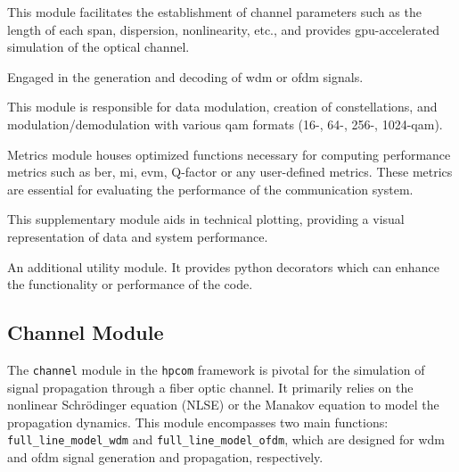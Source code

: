 \begin{description}[style=multiline, leftmargin=2.5cm, font=\normalfont]
    \item[\texttt{channel}] This module facilitates the establishment of channel parameters such as the length of each span, dispersion, nonlinearity, etc., and provides \acrshort{gpu}-accelerated simulation of the optical channel.
    \item[\texttt{signal}] Engaged in the generation and decoding of \acrlong{wdm} or \acrlong{ofdm} signals.
    \item[\texttt{modulation}] This module is responsible for data modulation, creation of constellations, and modulation/demodulation with various \acrlong{qam} formats (16-, 64-, 256-, 1024-\acrshort{qam}).
    \item[\texttt{metrics}] Metrics module houses optimized functions necessary for computing performance metrics such as \acrshort{ber}, \acrshort{mi}, \acrshort{evm}, Q-factor or any user-defined metrics. These metrics are essential for evaluating the performance of the communication system.
    \item[\texttt{plot}] This supplementary module aids in technical plotting, providing a visual representation of data and system performance.
    \item[\texttt{decorators}] An additional utility module. It provides python decorators which can enhance the functionality or performance of the code.
\end{description}

\subsection{Channel Module}
The \texttt{channel} module in the \texttt{hpcom} framework is pivotal for the simulation of signal propagation through a fiber optic channel. It primarily relies on the nonlinear Schrödinger equation (NLSE) or the Manakov equation to model the propagation dynamics. This module encompasses two main functions: \texttt{full\_line\_model\_wdm} and \texttt{full\_line\_model\_ofdm}, which are designed for \acrshort{wdm} and \acrshort{ofdm} signal generation and propagation, respectively.

